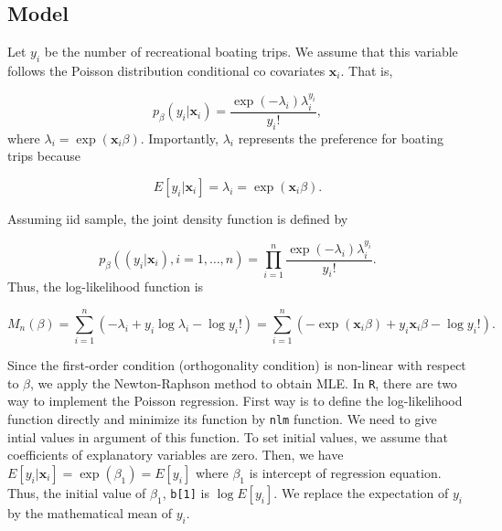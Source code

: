 \documentclass[
  12pt,
]{article}
\begin{document}
\hypertarget{model-2}{%
\subsection{Model}\label{model-2}}

Let \(y_i\) be the number of recreational boating trips. We assume that
this variable follows the Poisson distribution conditional co covariates
\(\mathbf{x}_i\). That is,

\begin{equation*}
  p_{\beta}(y_i | \mathbf{x}_i) = \frac{\exp(-\lambda_i) \lambda_i^{y_i}}{y_i !},
\end{equation*} where \(\lambda_i = \exp(\mathbf{x}_i \beta)\).
Importantly, \(\lambda_i\) represents the preference for boating trips
because

\begin{equation*}
  E[y_i | \mathbf{x}_i] = \lambda_i = \exp(\mathbf{x}_i \beta).
\end{equation*}

Assuming iid sample, the joint density function is defined by

\begin{equation*}
  p_{\beta}((y_i|\mathbf{x}_i), i = 1, \ldots, n) = \prod_{i=1}^n \frac{\exp(-\lambda_i) \lambda_i^{y_i}}{y_i !}.
\end{equation*} Thus, the log-likelihood function is

\begin{equation*}
  M_n(\beta) 
  = \sum_{i=1}^n (-\lambda_i + y_i \log \lambda_i - \log y_i !)  
  = \sum_{i=1}^n (- \exp(\mathbf{x}_i \beta) + y_i \mathbf{x}_i \beta - \log y_i !).
\end{equation*}

Since the first-order condition (orthogonality condition) is non-linear
with respect to \(\beta\), we apply the Newton-Raphson method to obtain
MLE. In \texttt{R}, there are two way to implement the Poisson
regression. First way is to define the log-likelihood function directly
and minimize its function by \texttt{nlm} function. We need to give
intial values in argument of this function. To set initial values, we
assume that coefficients of explanatory variables are zero. Then, we
have \(E[y_i | \mathbf{x}_i] = \exp(\beta_1) = E[y_i]\) where
\(\beta_1\) is intercept of regression equation. Thus, the initial value
of \(\beta_1\), \texttt{b{[}1{]}} is \(\log E[y_i]\). We replace the
expectation of \(y_i\) by the mathematical mean of \(y_i\).
\end{document}
